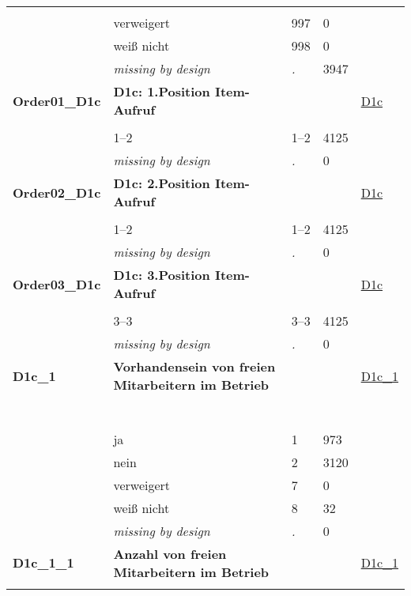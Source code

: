 \begin{longtable}{| L{2.65cm} | L{8cm} | C{1.5cm} | R{1.25cm} | C{2.25cm}  |}
   &  &  &  &  \\ 
   & verweigert & 997 & 0 &  \\ 
   & weiß nicht & 998 & 0 &  \\ 
   & \textit{missing by design} & \textit{.} & 3947 &  \\ 
   \midrule
\textbf{Order01\_D1c}\label{var:Order01:D1c} & \textbf{D1c: 1.Position Item-Aufruf} &  &  & \hyperref[D1c]{D1c} \\ 
   &  &  &  &  \\ 
   & 1--2 & 1--2 & 4125 &  \\ 
   & \textit{missing by design} & \textit{.} & 0 &  \\ 
   \midrule
\textbf{Order02\_D1c}\label{var:Order02:D1c} & \textbf{D1c: 2.Position Item-Aufruf} &  &  & \hyperref[D1c]{D1c} \\ 
   &  &  &  &  \\ 
   & 1--2 & 1--2 & 4125 &  \\ 
   & \textit{missing by design} & \textit{.} & 0 &  \\ 
   \midrule
\textbf{Order03\_D1c}\label{var:Order03:D1c} & \textbf{D1c: 3.Position Item-Aufruf} &  &  & \hyperref[D1c]{D1c} \\ 
   &  &  &  &  \\ 
   & 3--3 & 3--3 & 4125 &  \\ 
   & \textit{missing by design} & \textit{.} & 0 &  \\ 
   \midrule
\textbf{D1c\_1}\label{var:D1c:1} & \textbf{Vorhandensein von freien Mitarbeitern im Betrieb} &  &  & \hyperref[D1c:1]{D1c\_1} \\ 
   & \protect\subsection[Variablen D1c\_1 bis D5a]{} &  &  &  \\ 
   & ja & 1 & 973 &  \\ 
   & nein & 2 & 3120 &  \\ 
   & verweigert & 7 & 0 &  \\ 
   & weiß nicht & 8 & 32 &  \\ 
   & \textit{missing by design} & \textit{.} & 0 &  \\ 
   \midrule
\textbf{D1c\_1\_1}\label{var:D1c:1:1} & \textbf{Anzahl von freien Mitarbeitern im Betrieb} &  &  & \hyperref[D1c:1]{D1c\_1} \\ 
   &  &  &  &  \\ 

\end{longtable}
